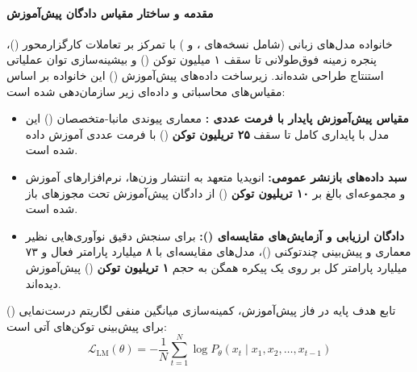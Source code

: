 \item {}

\paragraph*{مقدمه و ساختار مقیاس دادگان پیش‌آموزش}
خانواده مدل‌های زبانی  (شامل نسخه‌های ،  و ) با تمرکز بر تعاملات کارگزارمحور ()، پنجره زمینه فوق‌طولانی تا سقف ۱ میلیون توکن () و بیشینه‌سازی توان عملیاتی استنتاج طراحی شده‌اند. زیرساخت داده‌های پیش‌آموزش () این خانواده بر اساس مقیاس‌های محاسباتی و داده‌ای زیر سازمان‌دهی شده است:
\begin{itemize}
    \item \textbf{مقیاس پیش‌آموزش پایدار با فرمت عددی :} معماری پیوندی مانبا-متخصصان () این مدل با پایداری کامل تا سقف \textbf{۲۵ تریلیون توکن} () با فرمت عددی  آموزش داده شده است.
    \item \textbf{سبد داده‌های بازنشر عمومی:} انویدیا متعهد به انتشار وزن‌ها، نرم‌افزارهای آموزش و مجموعه‌ای بالغ بر \textbf{۱۰ تریلیون توکن} () از دادگان پیش‌آموزش تحت مجوزهای باز شده است.
    \item \textbf{دادگان ارزیابی و آزمایش‌های مقایسه‌ای ():} برای سنجش دقیق نوآوری‌هایی نظیر معماری  و پیش‌بینی چندتوکنی ()، مدل‌های مقایسه‌ای با ۸ میلیارد پارامتر فعال و ۷۳ میلیارد پارامتر کل بر روی یک پیکره همگن به حجم \textbf{۱ تریلیون توکن} () پیش‌آموزش دیده‌اند.
\end{itemize}

تابع هدف پایه در فاز پیش‌آموزش، کمینه‌سازی میانگین منفی لگاریتم درست‌نمایی () برای پیش‌بینی توکن‌های آتی است:
\begin{equation}
    \mathcal{L}_{\text{LM}}(\theta) = - \frac{1}{N} \sum_{t=1}^{N} \log P_\theta(x_t \mid x_1, x_2, \dots, x_{t-1})
\end{equation}

